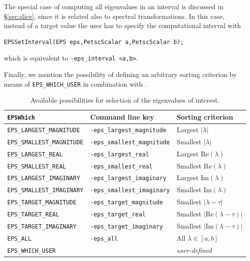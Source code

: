 The special case of computing all eigenvalues in an interval is discussed in \S\ref{sec:slice}, since it is related also to spectral transformations. In this case, instead of a target value the user has to specify the computational interval with
	\begin{Verbatim}[fontsize=\small]
	EPSSetInterval(EPS eps,PetscScalar a,PetscScalar b);
	\end{Verbatim}
which is equivalent to \Verb!-eps_interval <a,b>!.

Finally, we mention the possibility of defining an arbitrary sorting criterion by means of \texttt{EPS\_WHICH\_USER} in combination with .

\begin{table}
\centering
{\small \begin{tabular}{lll}
\texttt{EPSWhich}                  & Command line key                   & Sorting criterion \\\hline
\texttt{EPS\_LARGEST\_MAGNITUDE}   & \texttt{-eps\_largest\_magnitude}  & Largest $|\lambda|$ \\
\texttt{EPS\_SMALLEST\_MAGNITUDE}  & \texttt{-eps\_smallest\_magnitude} & Smallest $|\lambda|$ \\
\texttt{EPS\_LARGEST\_REAL}        & \texttt{-eps\_largest\_real}       & Largest $\mathrm{Re}(\lambda)$ \\
\texttt{EPS\_SMALLEST\_REAL}       & \texttt{-eps\_smallest\_real}      & Smallest $\mathrm{Re}(\lambda)$ \\
\texttt{EPS\_LARGEST\_IMAGINARY}   & \texttt{-eps\_largest\_imaginary}  & Largest $\mathrm{Im}(\lambda)$\footnotemark \\
\texttt{EPS\_SMALLEST\_IMAGINARY}  & \texttt{-eps\_smallest\_imaginary} & Smallest $\mathrm{Im}(\lambda)$\addtocounter{footnote}{-1}\footnotemark \\
\hline
\texttt{EPS\_TARGET\_MAGNITUDE}    & \texttt{-eps\_target\_magnitude}   & Smallest $|\lambda-\tau|$ \\
\texttt{EPS\_TARGET\_REAL}         & \texttt{-eps\_target\_real}        & Smallest $|\mathrm{Re}(\lambda-\tau)|$ \\
\texttt{EPS\_TARGET\_IMAGINARY}    & \texttt{-eps\_target\_imaginary}   & Smallest $|\mathrm{Im}(\lambda-\tau)|$ \\
\texttt{EPS\_ALL}                  & \texttt{-eps\_all}                 & All $\lambda\in[a,b]$ \\
\hline
\texttt{EPS\_WHICH\_USER}          &                                    & \emph{user-defined} \\\hline
\end{tabular} }
\caption{\label{tab:portion}Available possibilities for selection of the eigenvalues of interest.}
\end{table}

